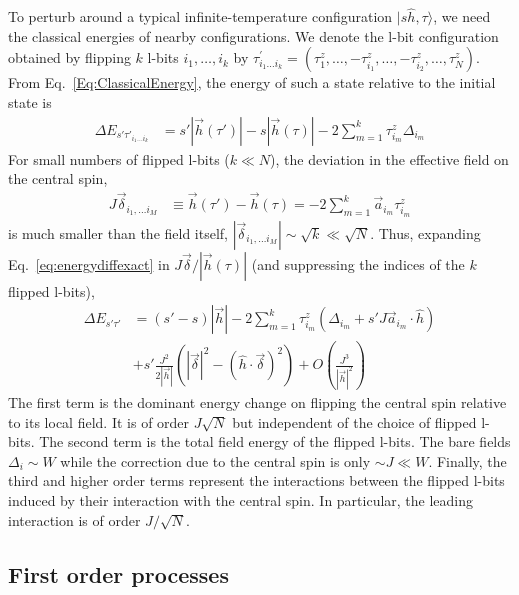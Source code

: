 \documentclass[aps,pra,twocolumn,a4paper,showpacs,superscriptaddress,floatfix,10pt]{revtex4}
\newcommand{\ket}[1]{|#1\rangle}
\begin{document}
To perturb around a typical infinite-temperature configuration $\ket{s \hat{h}, \tau}$, we need the classical energies of nearby configurations.
We denote the l-bit configuration obtained by flipping $k$ l-bits $i_1, \ldots, i_k$ by $\tau^\prime_{i_1 \ldots i_k} = (\tau^z_1, \ldots, -\tau^z_{i_1},\ldots, -\tau^z_{i_2},  \ldots, \tau^z_N)$.
From Eq.~\eqref{Eq:ClassicalEnergy}, the energy of such a state relative to the initial state is
\begin{align}
\label{eq:energydiffexact}
	\Delta E_{s' \tau'_{i_1 \ldots i_k}} &=  s' |\vec{h}(\tau')| - s |\vec{h}(\tau)| - 2 \sum_{m=1}^k \tau^z_{i_m} \Delta_{i_m}
\end{align}
For small numbers of flipped l-bits ($k \ll N$), the deviation in the effective field on the central spin,
\begin{align}
	J \vec{\delta}_{i_1, \ldots i_M} &\equiv \vec{h}(\tau')-\vec{h}(\tau) = -2 \sum_{m=1}^k \vec{a}_{i_m} \tau^z_{i_m}
\end{align}
is much smaller than the field itself, $|\vec{\delta}_{i_1, \ldots i_M}| \sim \sqrt{k} \ll \sqrt{N}$.
Thus, expanding Eq.~\eqref{eq:energydiffexact} in $J \vec{\delta}/|\vec{h}(\tau)|$ (and suppressing the indices of the $k$ flipped l-bits),
\begin{align}
\label{eq:classenergydifferences}
	\Delta E_{s' \tau'} &=(s' - s)|\vec{h}|%
	- 2 \sum_{m=1}^k \tau^z_{i_m}(\Delta_{i_m} 	+ s' J \vec{a}_{i_m} \cdot \hat{h}) \nonumber\\
	&+ s' \frac{J^2}{2|\vec{h}|}\left( |\vec{\delta}|^2 - (\hat{h}\cdot \vec{\delta})^2 \right) + O\left(\frac{J^3}{|\vec{h}|^2}\right)
\end{align}
The first term is the dominant energy change on flipping the central spin relative to its local field. It is of order $J\sqrt{N}$ but independent of the choice of flipped l-bits.
%
The second term is the total field energy of the flipped l-bits. The bare fields $\Delta_i \sim W$ while the correction due to the central spin is only $\sim J \ll W$.
%
Finally, the third and higher order terms represent the interactions between the flipped l-bits induced by their interaction with the central spin.
In particular, the leading interaction is of order $J/\sqrt{N}$.


\subsection{First order processes} %
\label{sub:pt_first_order}
\end{document}
